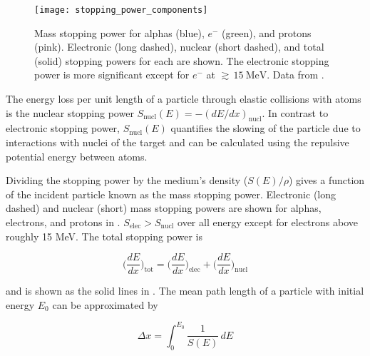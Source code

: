 \begin{figure}[t]
\texttt{[image: stopping\_power\_components]}
\caption[Mass stopping power for alphas (blue), $e^{-}$ (green), and protons (pink).  Electronic (long dashed), nuclear (short dashed),
and total (solid) stopping powers for each are shown.]{Mass stopping power for alphas (blue), $e^{-}$ (green), and protons
(pink).  Electronic (long dashed), nuclear (short dashed),
and total (solid) stopping powers for each are shown.  The electronic stopping power is more significant except for $e^-$ at
${\gtrsim}\, 15\ \mathrm{MeV}$.  Data from .}
\label{fig:mass_stopping_power}
\end{figure}

The energy loss per unit length of a particle through elastic collisions with atoms is the nuclear stopping power
$S_{\mathrm{nucl}}(E) = -(dE/dx)_{\mathrm{nucl}}$.  In contrast to electronic stopping power,
$S_{\mathrm{nucl}}(E)$ quantifies the slowing of the particle due to interactions with nuclei of the target and can be calculated using
the repulsive potential energy between atoms.

Dividing the stopping power by the medium's density ($S(E) / \rho$) gives a function of the incident particle known as
the mass stopping power.  Electronic (long dashed) and nuclear (short) mass stopping powers are shown for alphas, electrons, and protons
in .  $S_{\mathrm{elec}} > S_{\mathrm{nucl}}$ over all energy except for electrons above roughly 15
MeV.  The total stopping power is

\begin{equation}
\bigg( \frac{dE}{dx} \bigg)_{\mathrm{tot}} = \bigg( \frac{dE}{dx} \bigg)_{\mathrm{elec}} + \bigg( \frac{dE}{dx} \bigg)_{\mathrm{nucl}}
\end{equation}

\vspace{5pt}

\noindent and is shown as the solid lines in .  The mean path length of a particle with initial energy
$E_0$ can be approximated by

\begin{equation}
\Delta x = \int_0^{E_0} \frac{1}{S(E)}\, dE
\label{eq:stopping_power_dist_trav}
\end{equation}

